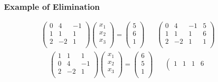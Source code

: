 \documentclass[10pt]{beamer}
\begin{document}
\begin{frame}
  \frametitle{Example of Elimination}
  \[
    \begin{array}{cc}
    \left(
      \begin{array}{rrr}
        0 &  4 & -1\\
        1 &  1 &  1\\
        2 & -2 &  1\\
      \end{array}
    \right)
    \left(
      \begin{array}{r}
        x_1 \\ x_2 \\ x_ 3 \\
      \end{array}
    \right) =
    \left(
      \begin{array}{r}
        5 \\ 6 \\ 1 \\
      \end{array}
    \right)
      & ~~~~
    \left(
      \begin{array}{rrr|r}
        0 &  4 & -1 & 5\\
        1 &  1 &  1 & 6\\
        2 & -2 &  1 & 1\\
      \end{array}
    \right)
    \end{array}
  \] \pause
  \[
    \begin{array}{cc}
    \left(
      \begin{array}{rrr}
        1 &  1 &  1\\
        0 &  4 & -1\\
        2 & -2 &  1\\
      \end{array}
    \right)
    \left(
      \begin{array}{r}
        x_1 \\ x_2 \\ x_ 3 \\
      \end{array}
    \right) =
    \left(
      \begin{array}{r}
        6 \\ 5 \\ 1 \\
      \end{array}
    \right)
      & ~~~~
    \left(
      \begin{array}{rrr|r}
        1 &  1 &  1 & 6\\

\end{array}
\end{array}\]
\end{frame}
\end{document}
